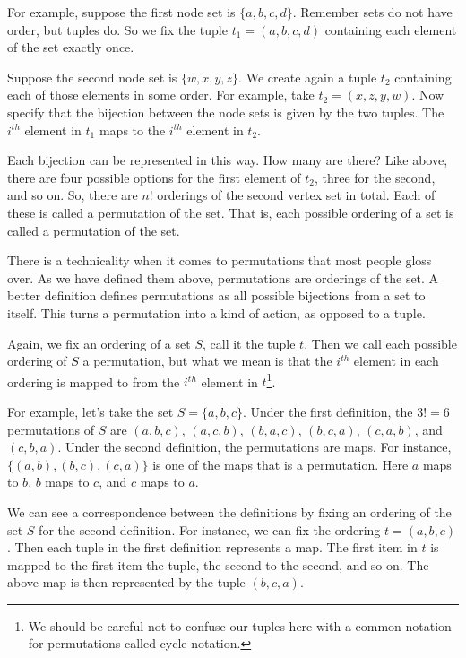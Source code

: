 \documentclass{iansnotes}
\begin{document}
  For example, suppose the first node set is $\{a, b, c, d\}$.
  Remember sets do not have order, but tuples do.
  So we fix the tuple $t_1 = (a, b, c, d)$ containing each element of the set exactly once.
  
  Suppose the second node set is $\{w, x, y, z\}$.
  We create again a tuple $t_2$ containing each of those elements in some order.
  For example, take $t_2 = (x, z, y, w)$.
  Now specify that the bijection between the node sets is given by the two tuples.
  The $i^{th}$ element in $t_1$ maps to the $i^{th}$ element in $t_2$.
  
  Each bijection can be represented in this way.
  How many are there?
  Like above, there are four possible options for the first element of $t_2$, three for the second, and so on.
  So, there are $n!$ orderings of the second vertex set in total.
  Each of these is called a permutation of the set.
  That is, each possible ordering of a set is called a permutation of the set.

  There is a technicality when it comes to permutations that most people gloss over.
  As we have defined them above, permutations are orderings of the set.
  A better definition defines permutations as all possible bijections from a set to itself.
  This turns a permutation into a kind of action, as opposed to a tuple.

  Again, we fix an ordering of a set $S$, call it the tuple $t$.
  Then we call each possible ordering of $S$ a permutation, but what we mean is that the $i^{th}$ element in each ordering is mapped to from the $i^{th}$ element in $t$\footnote{We should be careful not to confuse our tuples here with a common notation for permutations called cycle notation.}.

  For example, let's take the set $S = \{a,b,c\}$.
  Under the first definition, the $3! = 6$ permutations of $S$ are $(a,b,c)$, $(a,c,b)$, $(b,a,c)$, $(b,c,a)$, $(c,a,b)$, and $(c,b,a)$.
  Under the second definition, the permutations are maps.
  For instance, $\{(a,b),(b,c),(c,a)\}$ is one of the maps that is a permutation.
  Here $a$ maps to $b$, $b$ maps to $c$, and $c$ maps to $a$.

  We can see a correspondence between the definitions by fixing an ordering of the set $S$ for the second definition.
  For instance, we can fix the ordering $t = (a,b,c)$.
  Then each tuple in the first definition represents a map.
  The first item in $t$ is mapped to the first item the tuple, the second to the second, and so on.
  The above map is then represented by the tuple $(b,c,a)$.
\end{document}
